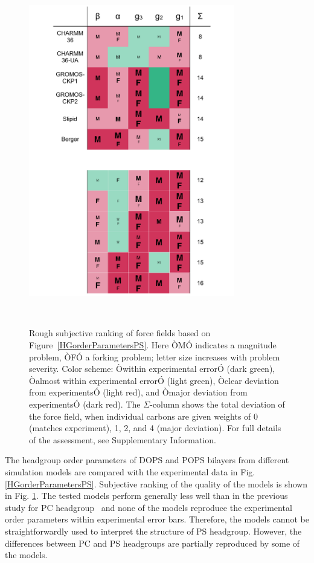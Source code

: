 \documentclass[aps,prl,superscriptaddress,twocolumn]{revtex4}
\begin{document}
\begin{figure}[]
  \centering
  \includegraphics[width=9.0cm]{../Figs/comparisonTablePS.pdf}
  \caption{\label{comparisonTablePS}
  Rough subjective ranking of force fields based on Figure~\ref{HGorderParametersPS}. Here ÒMÓ indicates a magnitude problem, ÒFÓ a forking problem; letter size increases with problem severity. Color scheme: Òwithin experimental errorÓ (dark green), Òalmost within experimental errorÓ (light green), Òclear deviation from experimentsÓ (light red), and Òmajor deviation from experimentsÓ (dark red). The $\Sigma$-column shows the total deviation of the force field, when individual carbons are given weights of 0 (matches experiment), 1, 2, and 4 (major deviation). For full details of the assessment, see Supplementary Information.
  }
   \\
\end{figure}

The headgroup order parameters of DOPS and POPS bilayers 
from different simulation models are compared with the experimental
data in Fig. \ref{HGorderParametersPS}. Subjective ranking
of the quality of the models is shown in Fig. \ref{comparisonTablePS}.
The tested models perform generally less well than in the previous
study for PC headgroup~\cite{botan15} and none of the models 
reproduce the experimental order parameters within
experimental error bars.
Therefore, the models cannot be straightforwardly used to interpret the
structure of PS headgroup. However, the differences between PC and PS headgroups
are partially reproduced by some of the models.
\end{document}
